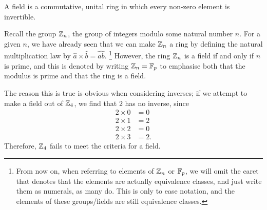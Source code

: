 \begin{definition}
	A field is a commutative, unital ring in which every non-zero element is invertible.
\end{definition}
Recall the group $\zn$, the group of integers modulo some natural number $n$.
For a given $n$, we have already seen that we can make $\zn$ a ring by defining the natural multiplication law by $\widehat{a} \times \widehat{b} = \widehat{ab}$.
\footnote{
	From now on, when referring to elements of $\zn$ or $\fp$, we will omit the caret that denotes that the elements are actually equivalence classes, and just write them as numerals, as many do. This is only to ease notation, and the elements of these groups/fields are still equivalence classes.
}
However, the ring $\zn$ is a field if and only if $n$ is prime, and this is denoted
by writing $\zn = \fp$ to emphasise both that the modulus is prime and
that the ring is a field.  

The reason this is true is obvious when considering inverses; if we attempt to make a field out of $\zn[4]$, we find that $2$ has no inverse, since
\begin{align*}
	2 \times 0 &= 0\\
	2 \times 1 &= 2\\
	2 \times 2 &= 0\\
	2 \times 3 &= 2.
\end{align*}
Therefore, $\zn[4]$ fails to meet the criteria for a field.

